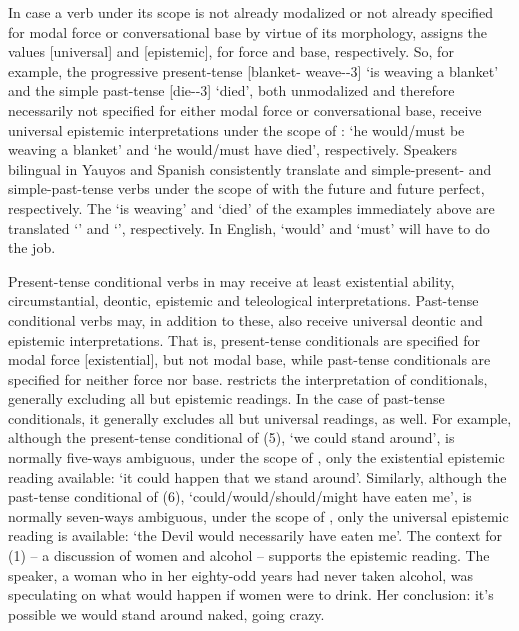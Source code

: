 In case a verb under its scope is not already modalized or not already specified for modal force or conversational base by virtue of its morphology,  assigns the values [universal] and [epistemic], for force and base, respectively. So, for example, the progressive present-tense   [blanket- weave--3] `is weaving a blanket' and the simple past-tense  [die--3] `died', both unmodalized and therefore necessarily not specified for either modal force or conversational base, receive universal epistemic interpretations under the scope of : `he would/must be weaving a blanket' and `he would/must have died', respectively. Speakers bilingual in Yauyos and Spanish consistently translate and simple-present- and simple-past-tense verbs under the scope of  with the future and future perfect, respectively. The  `is weaving' and  `died' of the examples immediately above are translated `' and `', respectively. In English, `would' and `must' will have to do the job.

Present-tense conditional verbs in \SYQ{} may receive at least existential ability, circumstantial, deontic, epistemic and teleological interpretations. Past-tense conditional verbs may, in addition to these, also receive universal deontic and epistemic interpretations. That is, present-tense conditionals are specified for modal force [existential], but not modal base, while past-tense conditionals are specified for neither force nor base.  restricts the interpretation of conditionals, generally excluding all but epistemic readings. In the case of past-tense conditionals, it generally excludes all but universal readings, as well. For example, although the present-tense conditional of (5),  `we could stand around', is normally five-ways ambiguous, under the scope of , only the existential epistemic reading available: `it could happen that we stand around'. Similarly, although the past-tense conditional of (6),   `could/would/should/might have eaten me', is normally seven-ways ambiguous, under the scope of , only the universal epistemic reading is available: `the Devil would necessarily have eaten me'. The context for (1) -- a discussion of women and alcohol -- supports the epistemic reading. The speaker, a woman who in her eighty-odd years had never taken alcohol, was speculating on what would happen if women were to drink. Her conclusion: it's possible we would stand around naked, going crazy. 

